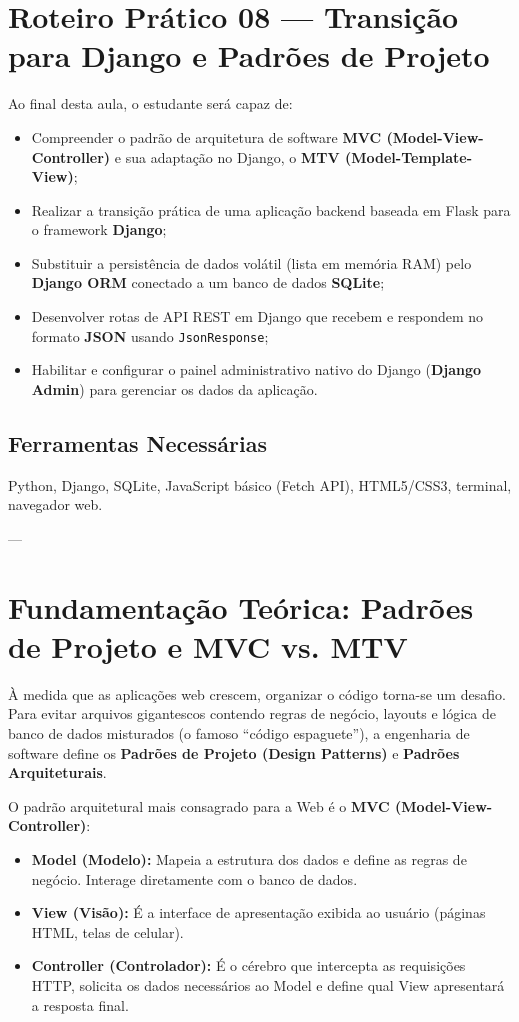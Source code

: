 \documentclass[12pt,a4paper]{article}
\begin{document}
\section*{Roteiro Prático 08 — Transição para Django e Padrões de Projeto}

\begin{boxAtividade}
Ao final desta aula, o estudante será capaz de:
\begin{itemize}
    \item Compreender o padrão de arquitetura de software \textbf{MVC (Model-View-Controller)} e sua adaptação no Django, o \textbf{MTV (Model-Template-View)};
    \item Realizar a transição prática de uma aplicação backend baseada em Flask para o framework \textbf{Django};
    \item Substituir a persistência de dados volátil (lista em memória RAM) pelo \textbf{Django ORM} conectado a um banco de dados \textbf{SQLite};
    \item Desenvolver rotas de API REST em Django que recebem e respondem no formato \textbf{JSON} usando \texttt{JsonResponse};
    \item Habilitar e configurar o painel administrativo nativo do Django (\textbf{Django Admin}) para gerenciar os dados da aplicação.
\end{itemize}
\end{boxAtividade}

\subsection*{Ferramentas Necessárias}

Python, Django, SQLite, JavaScript básico (Fetch API), HTML5/CSS3, terminal, navegador web.

---

\section{Fundamentação Teórica: Padrões de Projeto e MVC vs. MTV}

À medida que as aplicações web crescem, organizar o código torna-se um desafio. Para evitar arquivos gigantescos contendo regras de negócio, layouts e lógica de banco de dados misturados (o famoso ``código espaguete''), a engenharia de software define os \textbf{Padrões de Projeto (Design Patterns)} e \textbf{Padrões Arquiteturais}.

O padrão arquitetural mais consagrado para a Web é o \textbf{MVC (Model-View-Controller)}:
\begin{itemize}
    \item \textbf{Model (Modelo):} Mapeia a estrutura dos dados e define as regras de negócio. Interage diretamente com o banco de dados.
    \item \textbf{View (Visão):} É a interface de apresentação exibida ao usuário (páginas HTML, telas de celular).
    \item \textbf{Controller (Controlador):} É o cérebro que intercepta as requisições HTTP, solicita os dados necessários ao Model e define qual View apresentará a resposta final.
\end{itemize}
\end{document}
